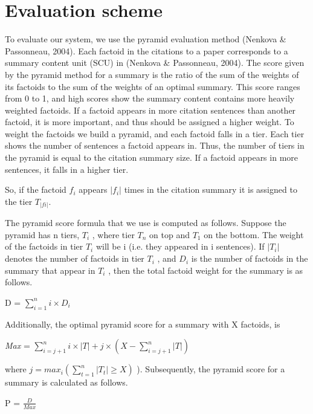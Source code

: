 \pagebreak
\section{Evaluation scheme}

To evaluate our system, we use the pyramid evaluation method (Nenkova \& Passonneau,
2004). Each factoid in the citations to a paper corresponds to a summary content unit
(SCU) in (Nenkova \& Passonneau, 2004).
The score given by the pyramid method for a summary is the ratio of the sum of the
weights of its factoids to the sum of the weights of an optimal summary. This score ranges
from 0 to 1, and high scores show the summary content contains more heavily weighted
factoids. If a factoid appears in more citation sentences than another factoid, it is more
important, and thus should be assigned a higher weight. To weight the factoids we build a
pyramid, and each factoid falls in a tier. Each tier shows the number of sentences a factoid
appears in. Thus, the number of tiers in the pyramid is equal to the citation summary size.
If a factoid appears in more sentences, it falls in a higher tier.

So, if the factoid $f_i$ appears $\lvert f_i \rvert$
 times in the citation summary it is assigned to the tier $T_{\lvert f i\rvert}$.
 
 The pyramid score formula that we use is computed as follows. Suppose the pyramid
has n tiers, $T_i$
, where tier $T_n$ on top and $T_1$ on the bottom. The weight of the factoids in
tier $T_i$ will be i (i.e. they appeared in i sentences). If $\lvert T_i
\rvert$ denotes the number of factoids in
tier $T_i$
, and $D_i$
is the number of factoids in the summary that appear in $T_i$
, then the total
factoid weight for the summary is as follows.

\begin{center}
    D = $\sum_{i=1}^{n} i \times D_i$
\end{center}

Additionally, the optimal pyramid score for a summary with X factoids, is

\begin{center}
\textit{Max} = $\sum_{i=j+1}^{n} i \times \lvert T \rvert  + j \times (X - \sum_{i=j+1}^{n}\lvert T \rvert)$
\end{center}
where $j = max_i(\sum_{t=1}^{n}\lvert T_t \rvert \geq X)$ ). Subsequently, the pyramid score for a summary is calculated
as follows.

\begin{center}
P = $\frac{D}{Max}$
\end{center}
